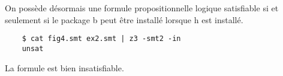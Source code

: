\documentclass{article}
\begin{document}
On possède désormais une formule propositionnelle logique satisfiable si et seulement si le package b peut être installé lorsque h est installé.

\lstset{language=bash}
\begin{lstlisting}
    $ cat fig4.smt ex2.smt | z3 -smt2 -in
    unsat
\end{lstlisting}

La formule est bien insatisfiable.


\section{}
\section{}
\section{}
\section{}
\section{}
\end{document}
